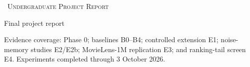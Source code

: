 \documentclass[11pt,a4paper]{article}
\begin{document}
\hypersetup{pageanchor=false}
\begin{titlepage}
\centering
\vspace*{15mm}
{\Large\textsc{\CourseCode\ Undergraduate Project Report}\par}
\vspace{18mm}
{\huge\bfseries\color{ReportBlue}\ReportTitle\par}
\vspace{9mm}
{\large\ReportSubtitle\par}
\vspace{20mm}
\ifx\ReportAuthor\empty\else{\Large\ReportAuthor\par}\vspace{4mm}\fi
\ifx\StudentID\empty{}\fi
\ifx\Supervisor\empty{}\fi
\ifx\Department\empty\else{\Department\par}\fi
\ifx\Institution\empty\else{\Institution\par}\fi
\vfill
{\large Final project report\par}
\vspace{4mm}
{\SubmissionDate\par}
\vspace{12mm}
\begin{minipage}{.86\linewidth}\small\centering
Evidence coverage: Phase 0; baselines B0--B4; controlled extension E1;
noise-memory studies E2/E2b; MovieLens-1M replication E3; and ranking-tail screen E4.
Experiments completed through 3 October 2026.
\end{minipage}
\end{titlepage}
\hypersetup{pageanchor=true}

\clearpage
\tableofcontents
\clearpage
\listoffigures
\listoftables
\clearpage

\clearpage
{}
\setcounter{table}{0}












\FloatBarrier
\clearpage
{}


\clearpage
\appendix




\end{document}
